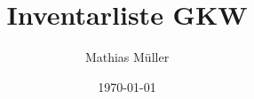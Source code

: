 \documentclass[12pt,a4paper]{article}
\title{Inventarliste GKW}
\author{Mathias Müller}
\date{\today}
\begin{document}
	\maketitle
	\tableofcontents
	\newpage

	\renewcommand{\arraystretch}{1.25}

	
\end{document}
